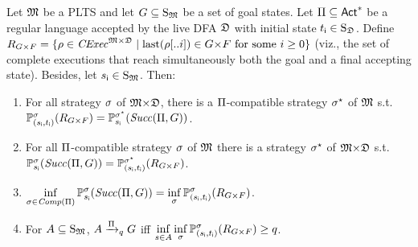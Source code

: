 \begin{lemma}\label{lm:mc:core}
  Let ${\mathfrak{M}}$ be a PLTS and let $G\subseteq\operatorname{S}_{\mathfrak{M}}$ be a set of
  goal states.
  Let $\Pi\subseteq{\rm \sf Act}^*$ be a regular language accepted by the
  live DFA ${\mathfrak{D}}$ with initial state ${t_{\textsf{i}}}\in\operatorname{S}_{\mathfrak{D}}$.  Define
  $R_{G{\times}F} = \{{\rho\in\mathit{CExec}^{{\mathfrak{M}}{\times}{\mathfrak{D}}}} \mid \mathrm{last}(\rho[..i])\in{G{\times}F} \text{ for some }{i\geq 0}\}$
  (viz., the set of complete executions that reach simultaneously both
  the goal and a final accepting state).
  Besides, let ${s_{\textsf{i}}}\in\operatorname{S}_{\mathfrak{M}}$. Then:
  \begin{enumerate}
  \item\label{lm:mc:core:i}%
    For all strategy $\sigma$ of ${\mathfrak{M}}{\times}{\mathfrak{D}}$, there is
    a $\Pi$-compatible strategy $\sigma^\star$ of ${\mathfrak{M}}$ s.t.\
    $\mathbb{P}^{\sigma}_{({s_{\textsf{i}}},{t_{\textsf{i}}})}(R_{G{\times}F}) = \mathbb{P}^{\sigma^\star}_{{s_{\textsf{i}}}}(\mathit{Succ}(\Pi,G))$.
  \item\label{lm:mc:core:ii}%
    For all $\Pi$-compatible strategy $\sigma$ of ${\mathfrak{M}}$
    there is a strategy $\sigma^\star$ of ${\mathfrak{M}}{\times}{\mathfrak{D}}$ s.t.\
    $\mathbb{P}^{\sigma}_{{s_{\textsf{i}}}}(\mathit{Succ}(\Pi,G)) = \mathbb{P}^{\sigma^\star}_{({s_{\textsf{i}}},{t_{\textsf{i}}})}(R_{G{\times}F})$.
  \item\label{lm:mc:core:iii}%
    $\displaystyle\inf_{\sigma\in\mathit{Comp}(\Pi)}\mathbb{P}^{\sigma}_{{s_{\textsf{i}}}}(\mathit{Succ}(\Pi,G)) = \inf_{\sigma}\mathbb{P}^{\sigma}_{({s_{\textsf{i}}},{t_{\textsf{i}}})}(R_{G{\times}F})$.
  \item\label{lm:mc:core:iv}%
    For $A\subseteq\operatorname{S}_{\mathfrak{M}}$, $A\xrightarrow{\Pi}_qG$ iff
    $\displaystyle\inf_{s\in A}\inf_{\sigma}\mathbb{P}^{\sigma}_{({s_{\textsf{i}}},{t_{\textsf{i}}})}(R_{G{\times}F})\geq q$.
  \end{enumerate}
\end{lemma}
%
\newcommand{\setR}{\mathcal{R}}
\newcommand{\setS}{\mathcal{S}}
\newcommand{\setRini}{\setR_{\mathsf{i}}}
\newcommand{\setSini}{\setS_{\mathsf{i}}}
